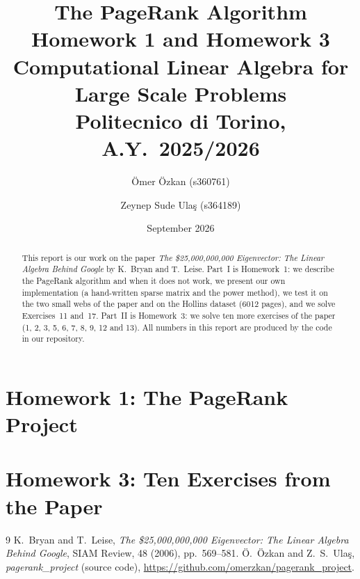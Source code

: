 \documentclass[11pt,a4paper]{article}
\title{\textbf{The PageRank Algorithm}\\[0.4em]
  \large Homework 1 and Homework 3\\[0.3em]
  \normalsize Computational Linear Algebra for Large Scale Problems\\
  Politecnico di Torino, A.Y.~2025/2026}
\author{Ömer Özkan (s360761) \and Zeynep Sude Ulaş (s364189)}
\date{September 2026}
\begin{document}
\maketitle

\begin{abstract}
\noindent
This report is our work on the paper \emph{The \$25,000,000,000 Eigenvector: The Linear Algebra Behind Google} by K.~Bryan and T.~Leise.
Part~I is Homework~1: we describe the PageRank algorithm and when it does not work, we present our own implementation (a hand-written sparse matrix and the power method), we test it on the two small webs of the paper and on the Hollins dataset (6012 pages), and we solve Exercises~11 and~17.
Part~II is Homework~3: we solve ten more exercises of the paper (1, 2, 3, 5, 6, 7, 8, 9, 12 and 13).
All numbers in this report are produced by the code in our repository.
\end{abstract}

\tableofcontents

\clearpage
\part{Homework 1: The PageRank Project}






\clearpage
\part{Homework 3: Ten Exercises from the Paper}












\clearpage
\begin{thebibliography}{9}
 K.~Bryan and T.~Leise,
  \emph{The \$25,000,000,000 Eigenvector: The Linear Algebra Behind Google},
  SIAM Review, 48 (2006), pp.~569--581.
 Ö.~Özkan and Z.~S.~Ulaş, \emph{pagerank\_project} (source code),
  \url{https://github.com/omerzkan/pagerank_project}.
\end{thebibliography}
\end{document}
